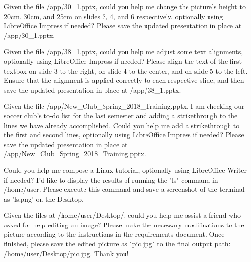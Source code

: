 \documentclass{llmxive}
\begin{document}
\begin{instructionbox}
Given the file \textasciigrave{}/app/30\_1.pptx\textasciigrave{}, could you help me change the picture's height to 20cm, 30cm, and 25cm on slides 3, 4, and 6 respectively, optionally using LibreOffice Impress if needed? Please save the updated presentation in place at \textasciigrave{}/app/30\_1.pptx\textasciigrave{}.
\end{instructionbox}

\begin{instructionbox}
Given the file \textasciigrave{}/app/38\_1.pptx\textasciigrave{}, could you help me adjust some text alignments, optionally using LibreOffice Impress if needed? Please align the text of the first textbox on slide 3 to the right, on slide 4 to the center, and on slide 5 to the left. Ensure that the alignment is applied correctly to each respective slide, and then save the updated presentation in place at \textasciigrave{}/app/38\_1.pptx\textasciigrave{}.
\end{instructionbox}

\begin{instructionbox}
Given the file \textasciigrave{}/app/New\_Club\_Spring\_2018\_Training.pptx\textasciigrave{}, I am checking our soccer club's to-do list for the last semester and adding a strikethrough to the lines we have already accomplished. Could you help me add a strikethrough to the first and second lines, optionally using LibreOffice Impress if needed? Please save the updated presentation in place at \textasciigrave{}/app/New\_Club\_Spring\_2018\_Training.pptx\textasciigrave{}.
\end{instructionbox}

\begin{instructionbox}
Could you help me compose a Linux tutorial, optionally using LibreOffice Writer if needed? I'd like to display the results of running the "ls" command in /home/user. Please execute this command and save a screenshot of the terminal as 'ls.png' on the Desktop.
\end{instructionbox}

\begin{instructionbox}
Given the files at \textasciigrave{}/home/user/Desktop/\textasciigrave{}, could you help me assist a friend who asked for help editing an image? Please make the necessary modifications to the picture according to the instructions in the requirements document. Once finished, please save the edited picture as "pic.jpg" to the final output path: \textasciigrave{}/home/user/Desktop/pic.jpg\textasciigrave{}. Thank you!
\end{instructionbox}
\end{document}
